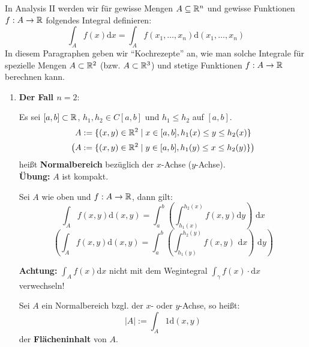 \documentclass[a4paper,twoside,DIV15,BCOR12mm,chapterprefix=true,headings=twolinechapter]{scrbook}
\begin{document}
In Analysis II werden wir für gewisse Mengen $A\subseteq\mathbb{R}^n$ und gewisse Funktionen
$f:A\to\mathbb{R}$ folgendes Integral definieren:
\[\int_A f(x)\text{d}x=\int_A f(x_1,\ldots,x_n)\text{d}(x_1,\ldots,x_n)\]
In diesem Paragraphen geben wir "`Kochrezepte"' an, wie man solche Integrale
für spezielle Mengen $A\subset\mathbb{R}^2$ (bzw. $A\subset\mathbb{R}^3$) und stetige Funktionen
$f:A\to\mathbb{R}$ berechnen kann.

\renewcommand{\theenumi}{\Roman{enumi}}
\renewcommand{\labelenumi}{\theenumi}

\begin{enumerate}
\item \textbf{Der Fall $n=2$}:\\
\begin{definition*}
Es sei $[a,b]\subset\mathbb{R}$, $h_1,h_2\in C[a,b]$ und $h_1\le h_2$ auf $[a,b]$.
\[A:=\{(x,y)\in\mathbb{R}^2\mid x\in[a,b],h_1(x)\le y\le h_2(x)\}\]
\[\left(A:=\{(x,y)\in\mathbb{R}^2\mid y\in[a,b],h_1(y)\le x\le h_2(y)\}\right)\]
heißt \textbf{Normalbereich} bezüglich der $x$-Achse ($y$-Achse).\\
\textbf{Übung:} $A$ ist kompakt.
\end{definition*}

\begin{satz}
Sei $A$ wie oben und $f:A\to\mathbb{R}$, dann gilt:
\[\int_A f(x,y)\text{d}(x,y)=\int_a^b\left(\int_{h_1(x)}^{h_2(x)} f(x,y)\text{d}y\right)\text{ d}x\]
\[\left(\int_A f(x,y)\text{d}(x,y)=\int_a^b\left(\int_{h_1(y)}^{h_2(y)} f(x,y)\text{ d}x\right)\text{ d}y\right)\]
\end{satz}

\textbf{Achtung:} $\int_A f(x)\text{d}x$ nicht mit dem Wegintegral $\int_\gamma f(x)\cdot\text{d}x$
verwechseln!

\begin{definition*}
Sei $A$ ein Normalbereich bzgl. der $x$- oder $y$-Achse, so heißt:
\[|A|:=\int_A 1\text{d}(x,y)\]
der \textbf{Flächeninhalt} von $A$.
\end{definition*}


\end{enumerate}
\end{document}

